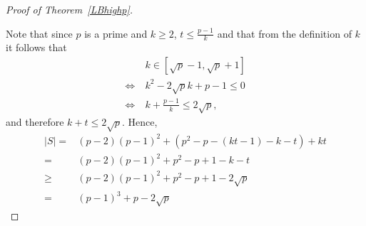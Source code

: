 \documentclass[12pt]{amsart}
\newcommand{\<}{\langle}
\renewcommand{\>}{\rangle}
\numberwithin{equation}{section}
\numberwithin{theorem}{section}
\begin{document}
\begin{proof}[Proof of Theorem~\ref{LBhighp}]
\begin{itemize}
\end{itemize}
Note that since $p$ is a prime and $k\geq 2$, $t\leq \frac{p-1}{k}$ and that from the definition of $k$ it follows that 
\begin{equation*}
\begin{split}   
&k\in [\sqrt{p}-1,\sqrt{p}+1]\\
\Leftrightarrow \ &k^2-2\sqrt{p}k+p-1\leq 0\\
\Leftrightarrow \ &k+\frac{p-1}{k}\leq 2\sqrt{p},
\end{split}
\end{equation*}
and therefore $k+t\leq 2\sqrt{p}$.
Hence, 
\begin{equation*}
\begin{split}   
|S|=&(p-2)(p-1)^2+(p^2-p-(kt-1)-k-t)+kt \\
=&(p-2)(p-1)^2+p^2-p+1-k-t \\
\geq & (p-2)(p-1)^2+p^2-p+1-2\sqrt{p} \\
=& (p-1)^3 +p-2\sqrt{p}
\end{split}
\end{equation*}

\end{proof}
\end{document}
